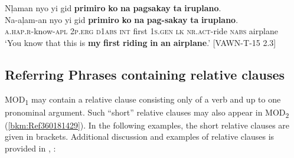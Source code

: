 \ea
Nļaman  nyo  yi  gid  \textbf{primiro}  \textbf{ko}  \textbf{na}  \textbf{pagsakay} \textbf{ta}  \textbf{iruplano}. \\\smallskip
 \gll Na-aļam-an  nyo  yi  gid  \textbf{primiro}  \textbf{ko}  \textbf{na}  \textbf{pag-sakay} \textbf{ta}  \textbf{iruplano}. \\
\textsc{a.hap.r}-know-\textsc{apl}  2\textsc{p.erg}  \textsc{d1abs}  \textsc{int}  first  1\textsc{s.gen}  \textsc{lk}  \textsc{nr.act}-ride \textsc{nabs}  airplane \\
\glt `You know that this is \textbf{my} \textbf{first} \textbf{riding} \textbf{in} \textbf{an} \textbf{airplane}.’ [VAWN-T-15 2.3]
\z

\subsection{Referring Phrases containing relative clauses}
\label{sec:rpscontainingrelativeclauses}

MOD\textsubscript{1} may contain a relative clause consisting only of a verb and up to one pronominal argument. Such “short” relative clauses may also appear in MOD\textsubscript{2} (\ref{bkm:Ref360181429}). In the following examples, the short relative clauses are given in brackets. Additional discussion and examples of relative clauses is provided in , :

